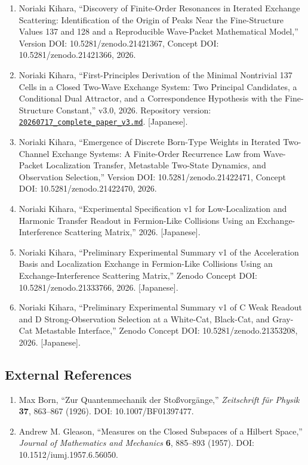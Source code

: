 \documentclass[
  a4paper,
  10pt]{article}
\providecommand{\tightlist}{%
  \setlength{\itemsep}{0pt}\setlength{\parskip}{0pt}}
\begin{document}
\begin{enumerate}
\def\labelenumi{\arabic{enumi}.}
\tightlist
\item
  Noriaki Kihara, ``Discovery of Finite-Order Resonances in Iterated
  Exchange Scattering: Identification of the Origin of Peaks Near the
  Fine-Structure Values 137 and 128 and a Reproducible Wave-Packet
  Mathematical Model,'' Version DOI: 10.5281/zenodo.21421367, Concept
  DOI: 10.5281/zenodo.21421366, 2026.
\item
  Noriaki Kihara, ``First-Principles Derivation of the Minimal
  Nontrivial 137 Cells in a Closed Two-Wave Exchange System: Two
  Principal Candidates, a Conditional Dual Attractor, and a
  Correspondence Hypothesis with the Fine-Structure Constant,'' v3.0,
  2026. Repository version:
  \href{../20260717/20260717_complete_paper_v3.md}{\texttt{20260717\_complete\_paper\_v3.md}}.
  {[}Japanese{]}.
\item
  Noriaki Kihara, ``Emergence of Discrete Born-Type Weights in Iterated
  Two-Channel Exchange Systems: A Finite-Order Recurrence Law from
  Wave-Packet Localization Transfer, Metastable Two-State Dynamics, and
  Observation Selection,'' Version DOI: 10.5281/zenodo.21422471, Concept
  DOI: 10.5281/zenodo.21422470, 2026.
\item
  Noriaki Kihara, ``Experimental Specification v1 for Low-Localization
  and Harmonic Transfer Readout in Fermion-Like Collisions Using an
  Exchange-Interference Scattering Matrix,'' 2026. {[}Japanese{]}.
\item
  Noriaki Kihara, ``Preliminary Experimental Summary v1 of the
  Acceleration Basis and Localization Exchange in Fermion-Like
  Collisions Using an Exchange-Interference Scattering Matrix,'' Zenodo
  Concept DOI: 10.5281/zenodo.21333766, 2026. {[}Japanese{]}.
\item
  Noriaki Kihara, ``Preliminary Experimental Summary v1 of C Weak
  Readout and D Strong-Observation Selection at a White-Cat, Black-Cat,
  and Gray-Cat Metastable Interface,'' Zenodo Concept DOI:
  10.5281/zenodo.21353208, 2026. {[}Japanese{]}.
\end{enumerate}

\subsection{External References}\label{external-references}

\begin{enumerate}
\def\labelenumi{\arabic{enumi}.}
\setcounter{enumi}{6}
\tightlist
\item
  Max Born, ``Zur Quantenmechanik der Stoßvorgänge,'' \emph{Zeitschrift
  für Physik} \textbf{37}, 863--867 (1926). DOI: 10.1007/BF01397477.
\item
  Andrew M. Gleason, ``Measures on the Closed Subspaces of a Hilbert
  Space,'' \emph{Journal of Mathematics and Mechanics} \textbf{6},
  885--893 (1957). DOI: 10.1512/iumj.1957.6.56050.
\end{enumerate}
\end{document}
